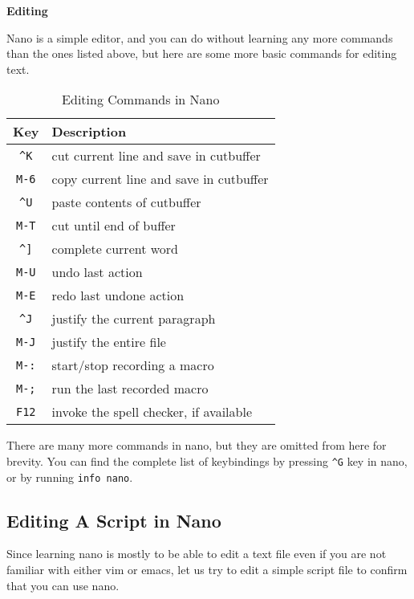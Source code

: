 \textbf{Editing}

Nano is a simple editor, and you can do without learning
any more commands than the ones listed above, but here
are some more basic commands for editing text.

\begin{table}[h!]
  \caption{Editing Commands in Nano}
  \begin{tabular}{c l}
    \toprule
    Key & Description \\
    \midrule
    \lstinline|^K| & cut current line and save in cutbuffer \\
    \lstinline|M-6| & copy current line and save in cutbuffer \\
    \lstinline|^U| & paste contents of cutbuffer \\
    \lstinline|M-T| & cut until end of buffer \\
    \lstinline|^]| & complete current word \\
    \lstinline|M-U| & undo last action \\
    \lstinline|M-E| & redo last undone action \\
    \lstinline|^J| & justify the current paragraph \\
    \lstinline|M-J| & justify the entire file \\
    \lstinline|M-:| & start/stop recording a macro \\
    \lstinline|M-;| & run the last recorded macro \\
    \lstinline|F12| & invoke the spell checker, if available \\
    \bottomrule
  \end{tabular}
\end{table}

There are many more commands in nano, but they are
omitted from here for brevity. You can find the
complete list of keybindings by pressing \lstinline|^G|
key in nano, or by running \lstinline[language=bash]{info nano}.

\subsection{Editing A Script in Nano}

Since learning nano is mostly to be able to edit
a text file even if you are not familiar with
either vim or emacs, let us try to edit a simple
script file to confirm that you can use nano.


